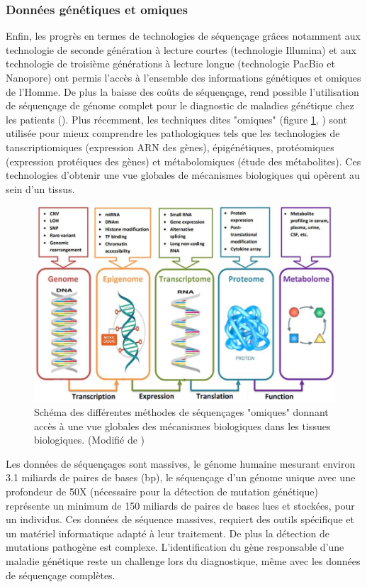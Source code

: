 \subsubsection{Données génétiques et omiques}
Enfin, les progrès en termes de technologies de séquençage grâces notamment aux technologie de seconde génération à lecture courtes (technologie Illumina) et aux technologie de troisième générations à lecture longue (technologie PacBio et Nanopore) ont permis l'accès à l'ensemble des informations génétiques et omiques de l'Homme. De plus la baisse des coûts de séquençage, rend possible l'utilisation de séquençage de génome complet pour le diagnostic de maladies génétique chez les patients (\cite{rabbani_next-generation_2012}). Plus récemment, les techniques dites "omiques" (figure \ref{fig:intro-omics}, \cite{momeni_survey_2020}) sont utilisée pour mieux comprendre les pathologiques tels que les technologies de tanscriptiomiques (expression ARN des gènes), épigénétiques, protéomiques (expression protéiques des gènes) et métabolomiques (étude des métabolites). Ces technologies d'obtenir une vue globales de mécanismes biologiques qui opèrent au sein d'un tissus. 
\begin{figure}[!htbp]
 \centering
 \includegraphics[width=1\textwidth]{figures/intro_omics.png}
 \caption[Méthodes de séquençages "omiques"]{Schéma des différentes méthodes de séquençages "omiques" donnant accès à une vue globales des mécanismes biologiques dans les tissues biologiques. (Modifié de \cite{momeni_survey_2020})}
 \label{fig:intro-omics}
\end{figure}
Les données de séquençages sont massives, le génome humaine mesurant environ 3.1 miliards de paires de bases (bp), le séquençage d'un génome unique avec une profondeur de 50X (nécessaire pour la détection de mutation génétique) représente un minimum de 150 miliards de paires de bases lues et stockées, pour un individus. Ces données de séquence massives, requiert des outils spécifique et un matériel informatique adapté à leur traitement. De plus la détection de mutations pathogène est complexe. L'identification du gène responsable d'une maladie génétique reste un challenge lors du diagnostique, même avec les données de séquençage complètes.

